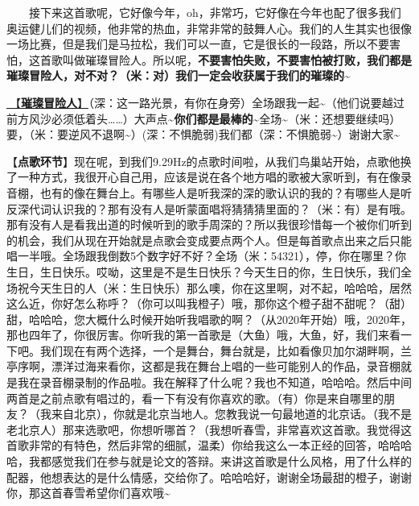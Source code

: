 \documentclass[]{ctexbook}
\begin{document}
  接下来这首歌呢，它好像今年，oh，非常巧，它好像在今年也配了很多我们奥运健儿们的视频，他非常的热血，非常非常的鼓舞人心。我们的人生其实也很像一场比赛，但是我们是马拉松，我们可以一直，它是很长的一段路，所以不要害怕，这首歌叫做璀璨冒险人。所以呢，\textbf{不要害怕失败，不要害怕被打败，我们都是璀璨冒险人，对不对？（米：对）我们一定会收获属于我们的璀璨的\textasciitilde{}}

\hyperref[adventurers]{🎵【\textbf{璀璨冒险人}】}（深：这一路光景，有你在身旁）全场跟我一起\textasciitilde（他们说要越过前方风沙必须低着头\ldots\ldots）大声点\textasciitilde{}\textbf{你们都是最棒的\textasciitilde{}}全场\textasciitilde（米：还想要继续吗）要，（米：要逆风不退啊\textasciitilde）(深：不惧脆弱)我们都（深：不惧脆弱\textasciitilde）谢谢大家\textasciitilde{}

【\textbf{点歌环节}】现在呢，到我们9.29Hz的点歌时间啦，从我们鸟巢站开始，点歌他换了一种方式，我很开心自己用，应该是说在各个地方唱的歌被大家听到，有在像录音棚，也有的像在舞台上。有哪些人是听我深的深的歌认识的我的？有哪些人是听反深代词认识我的？那有没有人是听蒙面唱将猜猜猜里面的？（米：有）是有哦。那有没有人是看我出道的时候听到的歌手周深的？所以我很珍惜每一个被你们听到的机会，我们从现在开始就是点歌会变成要点两个人。但是每首歌点出来之后只能唱一半哦。全场跟我倒数5个数字好不好？全场（米：54321），停，你在哪里？你生日，生日快乐。哎呦，这里是不是生日快乐？今天生日的你，生日快乐，我们全场祝今天生日的人（米：生日快乐）那么噢，你在这里啊，对不起，哈哈哈，居然这么近，你好怎么称呼？（你可以叫我橙子）哦，那你这个橙子甜不甜呢？（甜）甜，哈哈哈，您大概什么时候开始听我唱歌的啊？（从2020年开始）哦，2020年，那也四年了，你很厉害。你听我的第一首歌是（大鱼）哦，大鱼，好，我们来看一下吧。我们现在有两个选择，一个是舞台，舞台就是，比如看像贝加尔湖畔啊，兰亭序啊，漂洋过海来看你，这都是我在舞台上唱的一些可能别人的作品，录音棚就是我在录音棚录制的作品啦。我在解释了什么呢？我也不知道，哈哈哈。然后中间两首是之前点歌有唱过的，看一下有没有你喜欢的歌。（有）你是来自哪里的朋友？（我来自北京），你就是北京当地人。您教我说一句最地道的北京话。（我不是老北京人）那来选歌吧，你想听哪首？（我想听春雪，非常喜欢这首歌。我觉得这首歌非常的有特色，然后非常的细腻，温柔）你给我这么一本正经的回答，哈哈哈哈，我都感觉我们在参与就是论文的答辩。来讲这首歌是什么风格，用了什么样的配器，他想表达的是什么情感，交给你了。哈哈哈好，谢谢全场最甜的橙子，谢谢你，那这首春雪希望你们喜欢哦\textasciitilde{}
\end{document}
